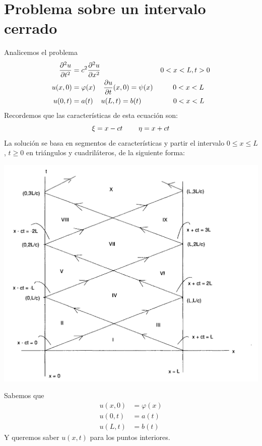 \documentclass[11pt]{book}
\theoremstyle{plain}
\theoremstyle{definition}
\begin{document}
\section{Problema sobre un intervalo cerrado}
Analicemos el problema
\setcounter{equation}{0}
\begin{align}
    \frac{\partial^2 u}{\partial t^2} &= c^2 \frac{\partial^2 u}{\partial x^2} \hspace{30mm} 0<x<L, t > 0\\ 
    u(x,0)&= \varphi(x) \hspace{4mm} \frac{\partial u}{\partial t}(x,0) = \psi(x)  \hspace{10mm} 0<x<L\\
    u(0,t)&= a(t) \hspace{4mm} u(L,t) = b(t)  \hspace{16mm} 0<x<L
\end{align}
Recordemos que las características de esta ecuación son:
\begin{equation*}
    \xi = x-ct \hspace{8mm} \eta = x+ct
\end{equation*}
La solución se basa en segmentos de características y partir el intervalo $0\leq x\leq L$, $t\geq 0$ en triángulos y cuadriláteros, de la siguiente forma:
\begin{center}
    \includegraphics[scale=0.2]{ParticionIntervalo.png}
\end{center}

Sabemos que 
\begin{align*}
    u(x,0) &= \varphi(x)\\
    u(0,t) &= a(t)\\
    u(L,t) &= b(t)
\end{align*}
Y queremos saber $u(x,t)$ para los puntos interiores.
\end{document}
